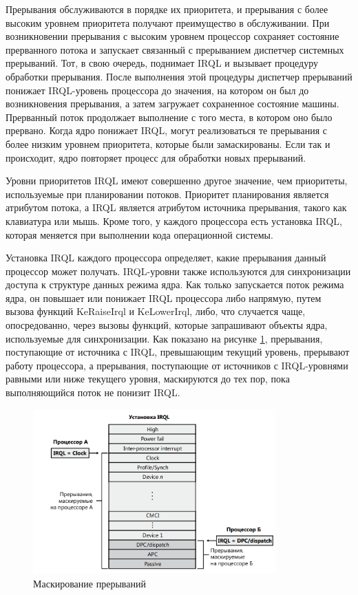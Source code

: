 \documentclass[a4paper,14pt]{extarticle}
\begin{document}
Прерывания обслуживаются в порядке их приоритета, и прерывания с более высоким уровнем приоритета получают преимущество в обслуживании. При возникновении прерывания с высоким уровнем процессор сохраняет состояние прерванного потока и запускает связанный с прерыванием диспетчер системных прерываний. Тот, в свою очередь, поднимает IRQL и вызывает процедуру обработки прерывания. После выполнения этой процедуры диспетчер прерываний понижает IRQL-уровень процессора до значения, на котором он был до возникновения прерывания, а затем загружает сохраненное состояние машины. Прерванный поток продолжает выполнение с того места, в котором оно было прервано. Когда ядро понижает IRQL, могут реализоваться те прерывания с более низким уровнем приоритета, которые были замаскированы. Если так и происходит, ядро повторяет процесс для обработки новых прерываний.

Уровни приоритетов IRQL имеют совершенно другое значение, чем приоритеты, используемые при планировании потоков. Приоритет планирования является атрибутом потока, а IRQL является атрибутом источника прерывания, такого как клавиатура или мышь. Кроме того, у каждого процессора есть установка IRQL, которая меняется при выполнении кода операционной системы.

Установка IRQL каждого процессора определяет, какие прерывания данный процессор может получать. IRQL-уровни также используются для синхронизации доступа к структуре данных режима ядра. Как только запускается поток режима ядра, он повышает или понижает IRQL процессора либо напрямую, путем вызова функций KeRaiseIrql и KeLowerIrql, либо, что случается чаще, опосредованно, через вызовы функций, которые запрашивают объекты ядра, используемые для синхронизации. Как показано на рисунке \ref{fig:mask}, прерывания, поступающие от источника с IRQL, превышающим текущий уровень, прерывают работу процессора, а прерывания, поступающие от источников с IRQL-уровнями равными или ниже текущего уровня, маскируются до тех пор, пока выполняющийся поток не понизит IRQL.

\clearpage
\begin{figure}[h]
	\centering
	\includegraphics[width=0.83\textwidth]{img/3.png}
	\caption{Маскирование прерываний}
	\label{fig:mask}
\end{figure} 
\end{document}
